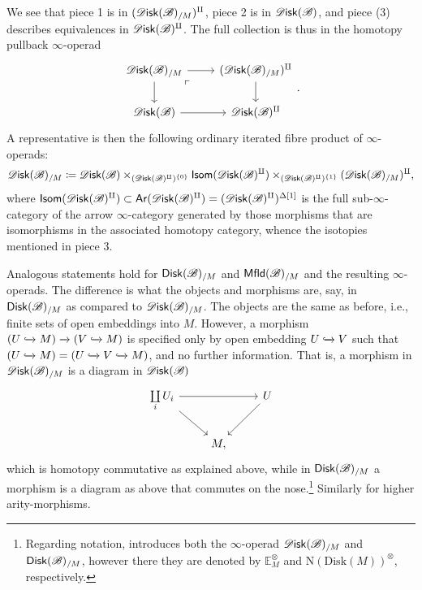 \documentclass[../text]{subfiles}
\begin{document}
    We see that piece 1 is in $(\disk(\bstr)_{/M})^{\amalg}$, piece 2 is in $\disk(\bstr)$, and piece (3) describes equivalences in $\disk(\bstr)^{\amalg}$. The full collection is thus in the homotopy pullback $\infty$-operad 
    \[
        \begin{tikzcd}
        \disk(\bstr)_{/M}\ar[r]\ar[d]\arrow[dr, phantom, "\ulcorner", very near start] & (\disk(\bstr)_{/M})^{\amalg}\ar[d]\\
        \disk(\bstr)\ar[r] & \disk(\bstr)^{\amalg}
        \end{tikzcd}.
    \]
    A representative is then the following ordinary iterated fibre product of $\infty$-operads:
    \[
        \disk(\bstr)_{/M}\coloneqq \disk(\bstr)\times_{(\disk(\bstr)^{\amalg})^{\{0\}}}\mathsf{Isom}(\disk(\bstr)^{\amalg})\times_{(\disk(\bstr)^{\amalg})^{\{1\}}}(\disk(\bstr)_{/M})^{\amalg},
    \]
    where $\mathsf{Isom}(\disk(\bstr)^{\amalg})\subset\mathsf{Ar}(\disk(\bstr)^{\amalg})=(\disk(\bstr)^{\amalg})^{\Delta[1]}$ is the full sub-$\infty$-category of the arrow $\infty$-category generated by those morphisms that are isomorphisms in the associated homotopy category, whence the isotopies mentioned in piece 3.

\begin{remark}
    Analogous statements hold for $\disk[r](\bstr)_{/M}$ and $\mfld[r](\bstr)_{/M}$ and the resulting $\infty$-operads. The difference is what the objects and morphisms are, say, in $\disk[r](\bstr)_{/M}$ as compared to $\disk(\bstr)_{/M}$. The objects are the same as before, i.e., finite sets of open embeddings into $M$. However, a morphism $(U \xhookrightarrow{} M) \xrightarrow{} (V \xhookrightarrow{} M)$ is specified only by open embedding $U \xhookrightarrow{} V$ such that $(U \xhookrightarrow{} M) = (U \xhookrightarrow{} V \xhookrightarrow{} M)$, and no further information. That is, a morphism in $\disk(\bstr)_{/M}$ is a diagram in $\disk (\bstr)$
    \begin{equation}
        \begin{tikzcd}
            \coprod\limits_{i} U_i \arrow[rr] \arrow[rd] & & U \arrow[ld] \\
            & M, &
        \end{tikzcd}
    \end{equation}
    which is homotopy commutative as explained above, while in $\disk[r](\bstr)_{/M}$ a morphism is a diagram as above that commutes on the nose.\footnote{Regarding notation, \cite{lurie_ha} introduces both the $\infty$-operad $\disk(\bstr)_{/M}$ and $\disk[r](\bstr)_{/M}$, however there they are denoted by $\mathbb{E}_M^\otimes$ and $\mathrm{N}(\mathrm{Disk}(M))^\otimes$, respectively.} 
    Similarly for higher arity-morphisms.
\end{remark}
\end{document}
